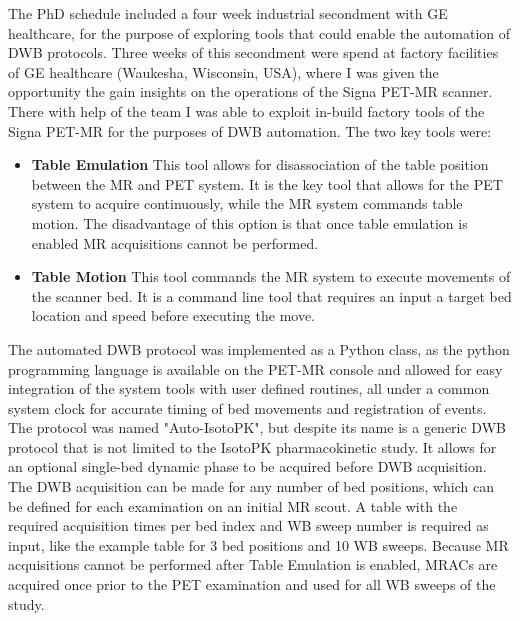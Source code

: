 The PhD schedule included a four week industrial secondment with GE healthcare, for the purpose of exploring tools that could enable the automation of DWB protocols. Three weeks of this secondment were spend at factory facilities of GE healthcare (Waukesha, Wisconsin, USA), where I was given the opportunity the gain insights on the operations of the Signa PET-MR scanner. There with help of the team I was able to exploit in-build factory tools of the Signa PET-MR for the purposes of DWB automation. The two key tools were: 
\begin{itemize}
    \item\textbf{Table Emulation}
    This tool allows for disassociation of the table position between the MR and PET system. It is the key tool that allows for the PET system to acquire continuously, while the MR system commands table motion. The disadvantage of this option is that once table emulation is enabled MR acquisitions cannot be performed.
    \item\textbf{Table Motion}
    This tool commands the MR system to execute movements of the scanner bed. It is a command line tool that requires an input a target bed location and speed before executing the move. 
\end{itemize}
% 
The automated DWB protocol was implemented as a Python class, as the python programming language is available on the PET-MR console and allowed for easy integration of the system tools with user defined routines, all under a common system clock for accurate timing of bed movements and registration of events.\\
The protocol was named "Auto-IsotoPK", but despite its name is a generic DWB protocol that is not limited to the IsotoPK pharmacokinetic study. It allows for an optional single-bed dynamic phase to be acquired before DWB acquisition. The DWB acquisition can be made for any number of bed positions, which can be defined for each examination on an initial MR scout. A table with the required acquisition times per bed index and WB sweep number is required as input, like the example table for 3 bed positions and 10 WB sweeps.
Because MR acquisitions cannot be performed after Table Emulation is enabled, MRACs are acquired once prior to the PET examination and used for all WB sweeps of the study. 

